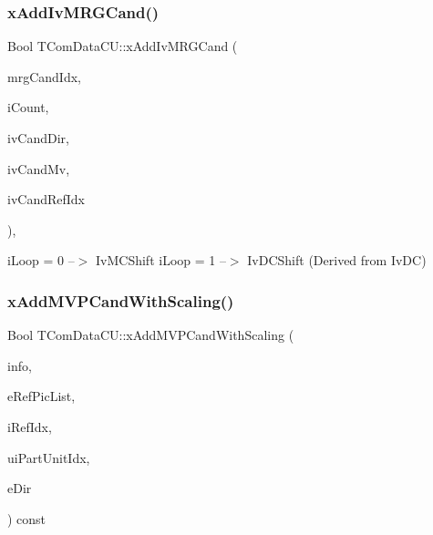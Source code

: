 \subsubsection{\texorpdfstring{x\+Add\+Iv\+M\+R\+G\+Cand()}{xAddIvMRGCand()}}
{\footnotesize\ttfamily Bool T\+Com\+Data\+C\+U\+::x\+Add\+Iv\+M\+R\+G\+Cand (\begin{DoxyParamCaption}\item[{Int}]{mrg\+Cand\+Idx,  }\item[{Int \&}]{i\+Count,  }\item[{Int $\ast$}]{iv\+Cand\+Dir,  }\item[{\hyperlink{class_t_com_mv}{T\+Com\+Mv} $\ast$}]{iv\+Cand\+Mv,  }\item[{Int $\ast$}]{iv\+Cand\+Ref\+Idx }\end{DoxyParamCaption})\hspace{0.3cm}{\ttfamily [inline]}, {\ttfamily [protected]}}

i\+Loop = 0 --$>$ Iv\+M\+C\+Shift i\+Loop = 1 --$>$ Iv\+D\+C\+Shift (Derived from Iv\+DC) \mbox{\label{class_t_com_data_c_u_af40cec1fd2306b694327d4d8819c7cd4}} 
\subsubsection{\texorpdfstring{x\+Add\+M\+V\+P\+Cand\+With\+Scaling()}{xAddMVPCandWithScaling()}}
{\footnotesize\ttfamily Bool T\+Com\+Data\+C\+U\+::x\+Add\+M\+V\+P\+Cand\+With\+Scaling (\begin{DoxyParamCaption}\item[{\hyperlink{_t_com_motion_info_8h_a4dfe7465dec69a9356d5166304173f8c}{A\+M\+V\+P\+Info} \&}]{info,  }\item[{const \hyperlink{_type_def_8h_a93cea48eb9dcfd661168dee82e41b384}{Ref\+Pic\+List}}]{e\+Ref\+Pic\+List,  }\item[{const Int}]{i\+Ref\+Idx,  }\item[{const U\+Int}]{ui\+Part\+Unit\+Idx,  }\item[{const \hyperlink{_type_def_8h_ab69fb1032d1b3f894ad3dd01e564e7e2}{M\+V\+P\+\_\+\+D\+IR}}]{e\+Dir }\end{DoxyParamCaption}) const\hspace{0.3cm}{\ttfamily [protected]}}


